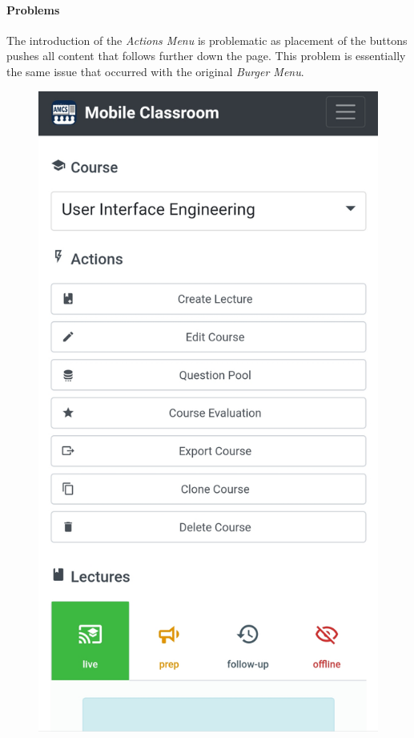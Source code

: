 \paragraph{Problems}
The introduction of the \emph{Actions Menu} is problematic as placement of the buttons pushes all content that follows further down the page. This problem is essentially the same issue that occurred with the original \emph{Burger Menu}.
\begin{figure}
	\centering
	\begin{minipage}[t]{.5\textwidth}
		\centering
		\includegraphics[width=0.95\linewidth]{screenshots/redesign/problem_main_view_course_actions.jpg}

\end{minipage}
\end{figure}
